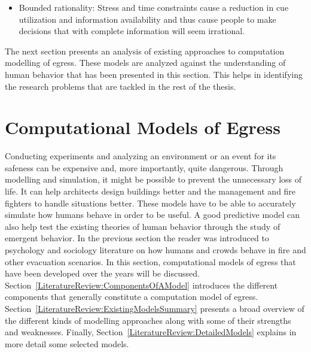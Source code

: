 \begin{itemize}
\item Bounded rationality: Stress and time constraints cause a reduction in cue utilization and information availability and thus cause people to make decisions that with complete information will seem irrational.
\end{itemize}

The next section presents an analysis of existing approaches to computation modelling of egress. These models are analyzed against the understanding of human behavior that has been presented in this section. This helps in identifying the research problems that are tackled in the rest of the thesis.

\section{Computational Models of Egress}
\label{LiteratureReview:EngineeringModels}

Conducting experiments and analyzing an environment or an event for its safeness can be expensive and, more importantly, quite dangerous. Through modelling and simulation,  it might be possible to prevent the unnecessary loss of life. It can help architects design buildings better and the management and fire fighters to handle situations better. These models have to be able to accurately simulate how humans behave in order to be useful. A good predictive model can also help test the existing theories of human behavior through the study of emergent behavior. In the previous section the reader was introduced to psychology and sociology literature on how humans and crowds behave in fire and other evacuation scenarios. In this section, computational models of egress that have been developed over the years will be discussed. Section~\ref{LiteratureReview:ComponentsOfAModel} introduces the different components that generally constitute a computation model of egress. Section~\ref{LiteratureReview:ExistingModelsSummary} presents a broad overview of the different kinds of modelling approaches along with some of their strengths and weaknesses. Finally, Section~\ref{LiteratureReview:DetailedModels} explains in more detail some selected models.

